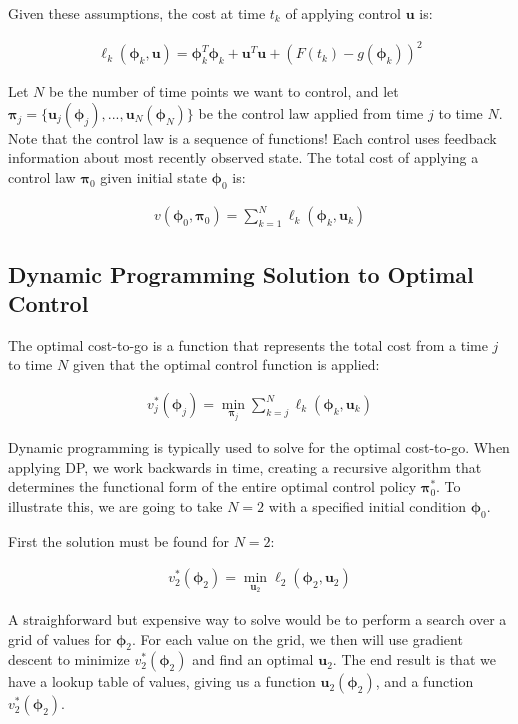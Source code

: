 \documentclass{article} %
\begin{document}
Given these assumptions, the cost at time $t_k$ of applying control $\bm{u}$ is:

\begin{align*}
\ell_k \left( \bm{\phi}_{k}, \bm{u} \right) = \bm{\phi}_{k}^T \bm{\phi}_{k} +
							\bm{u}^T \bm{u} +
							\left( F(t_k) - g(\bm{\phi}_{k}) \right) ^2
\end{align*}

Let $N$ be the number of time points we want to control, and let
$\bm{\pi}_j=\{ \bm{u}_j(\bm{\phi}_{j}), ..., \bm{u}_N(\bm{\phi}_{N}) \}$ be the control
law applied from time $j$ to time $N$. Note that the control law is a sequence of
functions! Each control uses feedback information about most recently observed state.
The total cost of applying a control law $\bm{\pi}_0$ given initial state
$\bm{\phi}_0$ is:

\begin{align*}
v\left( \bm{\phi}_0, \bm{\pi}_0 \right) = \sum_{k=1}^N \ell_k \left( \bm{\phi}_{k}, \bm{u}_k \right)
\end{align*}


\subsection{Dynamic Programming Solution to Optimal Control}

The optimal cost-to-go is a function that represents the total cost from a time
$j$ to time $N$ given that the optimal control function is applied:

\begin{align*}
v^*_j \left( \bm{\phi}_j \right) = \min_{\bm{\pi}_j} \sum_{k=j}^N \ell_k \left( \bm{\phi}_k, \bm{u}_k \right)
\end{align*}

Dynamic programming is typically used to solve for the optimal cost-to-go. When applying
DP, we work backwards in time, creating a recursive algorithm that determines the
functional form of the entire optimal control policy $\bm{\pi}_0^*$. To illustrate
this, we are going to take $N=2$ with a specified initial condition $\bm{\phi}_0$.

First the solution must be found for $N=2$:

\begin{align*}
v^*_2 \left( \bm{\phi}_2 \right) = \min_{\bm{u}_2} \ell_2 \left( \bm{\phi}_2, \bm{u}_2 \right)
\end{align*}

A straighforward but expensive way to solve would be to perform a search over a
grid of values for $\bm{\phi}_2$. For each value on the grid, we then will use
gradient descent to minimize $v^*_2 \left( \bm{\phi}_2 \right)$ and find an
optimal $\bm{u}_2$. The end result is that we have a lookup table of values,
giving us a function $\bm{u}_2(\bm{\phi}_2)$, and a function
$v^*_2 \left( \bm{\phi}_2 \right)$.
\end{document}
